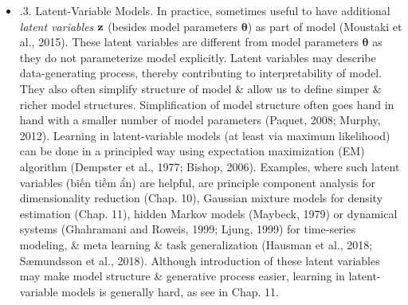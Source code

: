 \documentclass{article}
\newtheorem{remark}{Remark}
\begin{document}
\begin{itemize}
\begin{itemize}
\begin{itemize}
			Despite these challenges, Bayesian inference has been successfully applied to a variety of problems, including large-scale topic modeling(Hoffman et al., 2013), click-through-rate prediction (Graepel et al., 2010), data-efficient reinforcement learning in control systems (Deisenroth et al., 2015), online ranking systems (Herbrich et al., 2007), \& large-scale recommender systems. There are generic tools, e.g. Bayesian optimization (Brochu et al., 2009; Snoek et al., 2012; Shahriari et al., 2016), that are very useful ingredients for an efficient search of meta parameters of models or algorithms.
			\begin{remark}
				In ML literature, there can be a somewhat arbitrary separation between (random) ``variables'' \& ``parameters''. While parameters are estimated (e.g., via maximum likelihood), variables are usually marginalized out. In this book, not so strict with this separation because, in principle, can replace a prior on any parameter \& integrate it out, which would then turn parameter into a random variable according to aforementioned separation.
			\end{remark}
			\item {.3. Latent-Variable Models.} In practice, sometimes useful to have additional {\it latent variables} ${\bf z}$ (besides model parameters $\boldsymbol{\theta}$) as part of model (Moustaki et al., 2015). These latent variables are different from model parameters $\boldsymbol{\theta}$ as they do not parameterize model explicitly. Latent variables may describe data-generating process, thereby contributing to interpretability of model. They also often simplify structure of model \& allow us to define simper \& richer model structures. Simplification of model structure often goes hand in hand with a smaller number of model parameters (Paquet, 2008; Murphy, 2012). Learning in latent-variable models (at least via maximum likelihood) can be done in a principled way using expectation maximization (EM) algorithm (Dempster et al., 1977; Bishop, 2006). Examples, where such latent variables (biến tiềm ẩn) are helpful, are principle component analysis for dimensionality reduction (Chap. 10), Gaussian mixture models for density estimation (Chap. 11), hidden Markov models (Maybeck, 1979) or dynamical systems (Ghahramani and Roweis, 1999; Ljung, 1999) for time-series modeling, \& meta learning \& task generalization (Hausman et al., 2018; S\ae mundsson et al., 2018). Although introduction of these latent variables may make model structure \& generative process easier, learning in latent-variable models is generally hard, as see in Chap. 11.
			

\end{itemize}
\end{itemize}
\end{itemize}
\end{document}
